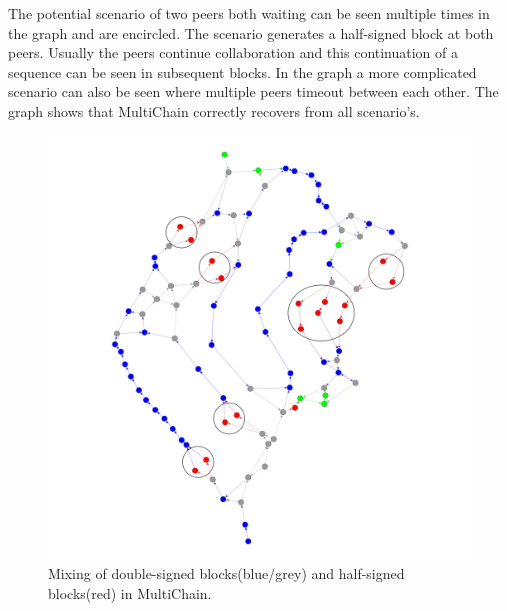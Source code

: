 The potential scenario of two peers both waiting can be seen multiple times in the graph and are encircled.
The scenario generates a half-signed block at both peers.
Usually the peers continue collaboration and this continuation of a sequence can be seen in subsequent blocks.
In the graph a more complicated scenario can also be seen where multiple peers timeout between each other.
The graph shows that MultiChain correctly recovers from all scenario's.

\begin{figure}
	\centerline{\includegraphics[scale=0.0375]{experimentation/deadlock/deadlock.png}}
	\caption{Mixing of double-signed blocks(blue/grey) and half-signed blocks(red) in MultiChain.}
	\label{fig:deadlock-double}
\end{figure}